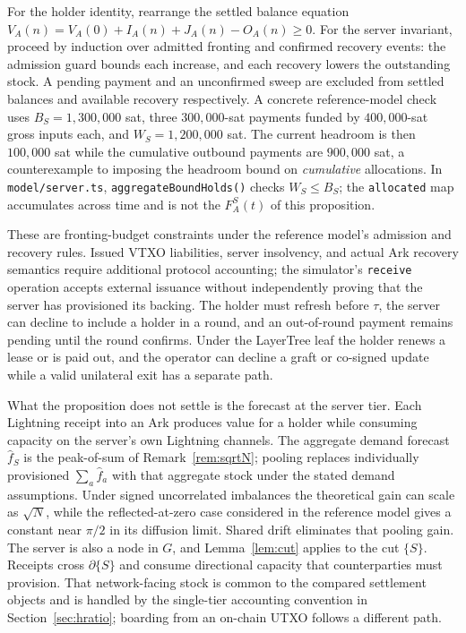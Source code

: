 \documentclass[11pt]{article}
\theoremstyle{plain}
\theoremstyle{definition}
\theoremstyle{remark}
\begin{document}
For the holder identity, rearrange the settled balance equation
$V_A(n)=V_A(0)+I_A(n)+J_A(n)-O_A(n)\ge 0$.
For the server invariant, proceed by induction over admitted fronting
and confirmed recovery events: the admission guard bounds each increase,
and each recovery lowers the outstanding stock. A pending payment and
an unconfirmed sweep are excluded from settled balances and available
recovery respectively. A concrete reference-model check uses
$B_S=1{,}300{,}000$ sat, three $300{,}000$-sat payments funded by
$400{,}000$-sat gross inputs each, and $W_S=1{,}200{,}000$ sat.
The current headroom is then $100{,}000$ sat while the cumulative
outbound payments are $900{,}000$ sat, a counterexample to imposing the
headroom bound on \emph{cumulative} allocations. In
\texttt{model/server.ts}, \texttt{aggregateBoundHolds()} checks
$W_S\le B_S$; the \texttt{allocated} map accumulates across time and is
not the $F^S_A(t)$ of this proposition.

These are fronting-budget constraints under the reference model's
admission and recovery rules. Issued VTXO liabilities, server insolvency,
and actual Ark recovery semantics require additional protocol accounting;
the simulator's \texttt{receive} operation accepts external issuance
without independently proving that the server has provisioned its backing.
The holder must refresh before $\tau$, the server can decline to include
a holder in a round, and an out-of-round payment remains pending until
the round confirms. Under the LayerTree leaf the holder renews a lease
or is paid out, and the operator can decline a graft or co-signed update
while a valid unilateral exit has a separate path.

What the proposition does not settle is the forecast at the server tier.
Each Lightning receipt into an Ark produces value for a holder while
consuming capacity on the server's own Lightning channels. The aggregate
demand forecast $\hat f_S$ is the peak-of-sum of
Remark~\ref{rem:sqrtN}; pooling replaces individually provisioned
$\sum_a\hat f_a$ with that aggregate stock under the stated demand
assumptions. Under signed uncorrelated imbalances the theoretical
gain can scale as $\sqrt N$, while the reflected-at-zero case considered
in the reference model gives a constant near $\pi/2$ in its diffusion
limit. Shared drift eliminates that pooling gain. The server is also
a node in $G$, and Lemma~\ref{lem:cut} applies to the cut $\{S\}$.
Receipts cross $\partial\{S\}$ and consume directional capacity
that counterparties must provision. That network-facing stock is
common to the compared settlement objects and is handled by the
single-tier accounting convention in Section~\ref{sec:hratio};
boarding from an on-chain UTXO follows a different path.
\end{document}
